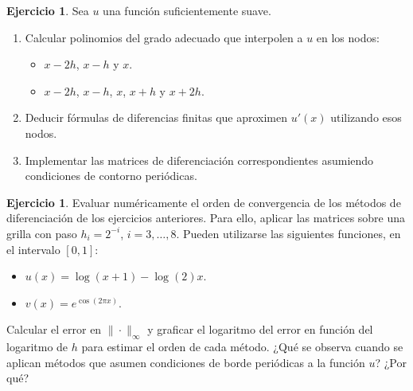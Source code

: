 \documentclass[12pt, a4paper]{amsbook}
\theoremstyle{remark}
\theoremstyle{definition}
\newtheorem{ejer}[teo]{Ejercicio}
\numberwithin{section}{chapter}
\numberwithin{subsection}{section}
\numberwithin{equation}{section}
\numberwithin{figure}{chapter}
\begin{document}
\begin{ejer} Sea $u$ una función suficientemente suave. 
  \begin{enumerate}[label=(\alph*)]
    \item Calcular polinomios del grado adecuado que interpolen a $u$ en los nodos:
    \begin{itemize}
      \item $x-2h$, $x-h$ y $x$.
      \item $x-2h$, $x-h$, $x$, $x+h$ y $x+2h$.
    \end{itemize}
    \item Deducir fórmulas de diferencias finitas que aproximen $u'(x)$ utilizando esos nodos. 
    \item Implementar las matrices de diferenciación correspondientes asumiendo condiciones de contorno periódicas. 
  \end{enumerate}
\end{ejer}

\begin{ejer} Evaluar numéricamente el orden de convergencia de los métodos de diferenciación de los ejercicios anteriores. Para ello, aplicar las matrices sobre una grilla con paso $h_i=2^{-i}$, $i=3,\dots,8$. Pueden utilizarse las siguientes funciones, en el intervalo $[0,1]$:
  \begin{itemize}
    \item $u(x) = \log(x+1)-\log(2)x$.
    \item $v(x) = e^{\cos(2\pi x)}$.
  \end{itemize}
Calcular el error en $\|\cdot\|_{\infty}$ y graficar el logaritmo del error en función del logaritmo de $h$ para estimar el orden de cada método. ¿Qué se observa cuando se aplican métodos que asumen condiciones de borde periódicas a la función $u$? ¿Por qué?
\end{ejer}
\end{document}
